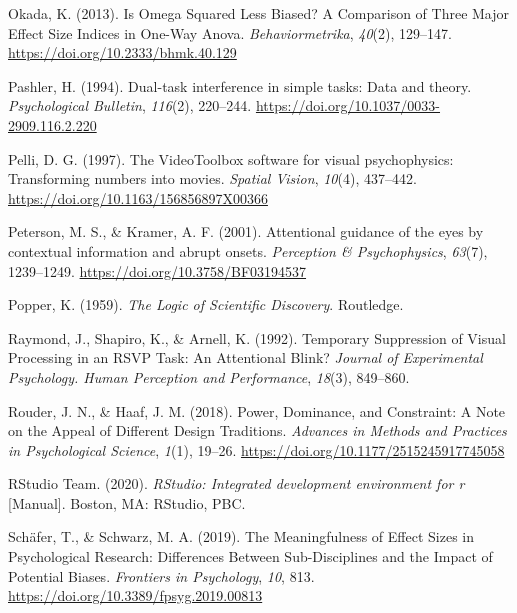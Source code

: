\documentclass[
  man]{apa6}
\newlength{\cslhangindent}
\newlength{\cslentryspacingunit} %
\newenvironment{CSLReferences}[2] %
 {%
  \setlength{\parindent}{0pt}
  \ifodd #1
  \let\oldpar\par
  \def\par{\hangindent=\cslhangindent\oldpar}
  \fi
  \setlength{\parskip}{#2\cslentryspacingunit}
 }%
 {}
\begin{document}
\begin{CSLReferences}{1}{0}
\leavevmode{}%
Okada, K. (2013). Is {Omega Squared Less Biased}? A {Comparison} of {Three Major Effect Size Indices} in {One-Way Anova}. \emph{Behaviormetrika}, \emph{40}(2), 129--147. \url{https://doi.org/10.2333/bhmk.40.129}

\leavevmode{}%
Pashler, H. (1994). Dual-task interference in simple tasks: Data and theory. \emph{Psychological Bulletin}, \emph{116}(2), 220--244. \url{https://doi.org/10.1037/0033-2909.116.2.220}

\leavevmode{}%
Pelli, D. G. (1997). The {VideoToolbox} software for visual psychophysics: Transforming numbers into movies. \emph{Spatial Vision}, \emph{10}(4), 437--442. \url{https://doi.org/10.1163/156856897X00366}

\leavevmode{}%
Peterson, M. S., \& Kramer, A. F. (2001). Attentional guidance of the eyes by contextual information and abrupt onsets. \emph{Perception \& Psychophysics}, \emph{63}(7), 1239--1249. \url{https://doi.org/10.3758/BF03194537}

\leavevmode{}%
Popper, K. (1959). \emph{The {Logic} of {Scientific Discovery}}. {Routledge}.

\leavevmode{}%
Raymond, J., Shapiro, K., \& Arnell, K. (1992). Temporary {Suppression} of {Visual Processing} in an {RSVP Task}: {An Attentional Blink}? \emph{Journal of Experimental Psychology. Human Perception and Performance}, \emph{18}(3), 849--860.

\leavevmode{}%
Rouder, J. N., \& Haaf, J. M. (2018). Power, {Dominance}, and {Constraint}: {A Note} on the {Appeal} of {Different Design Traditions}. \emph{Advances in Methods and Practices in Psychological Science}, \emph{1}(1), 19--26. \url{https://doi.org/10.1177/2515245917745058}

\leavevmode{}%
RStudio Team. (2020). \emph{{RStudio}: {Integrated} development environment for r} {[}Manual{]}. {Boston, MA}: {RStudio, PBC.}

\leavevmode{}%
Schäfer, T., \& Schwarz, M. A. (2019). The {Meaningfulness} of {Effect Sizes} in {Psychological Research}: {Differences Between Sub-Disciplines} and the {Impact} of {Potential Biases}. \emph{Frontiers in Psychology}, \emph{10}, 813. \url{https://doi.org/10.3389/fpsyg.2019.00813}


\end{CSLReferences}
\end{document}
